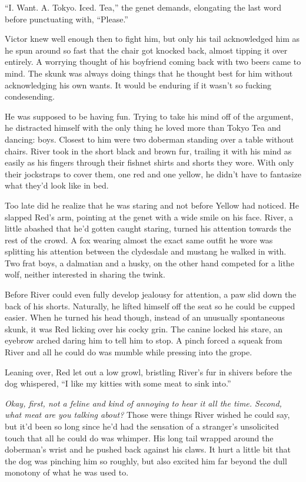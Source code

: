 ``I. Want. A. Tokyo. Iced. Tea,'' the genet demands, elongating the last
word before punctuating with, ``Please.''

Victor knew well enough then to fight him, but only his tail
acknowledged him as he spun around so fast that the chair got knocked
back, almost tipping it over entirely. A worrying thought of his
boyfriend coming back with two beers came to mind. The skunk was always
doing things that he thought best for him without acknowledging his own
wants. It would be enduring if it wasn't so fucking condesending.

He was supposed to be having fun. Trying to take his mind off of the
argument, he distracted himself with the only thing he loved more than
Tokyo Tea and dancing: boys. Closest to him were two doberman standing
over a table without chairs. River took in the short black and brown
fur, trailing it with his mind as easily as his fingers through their
fishnet shirts and shorts they wore. With only their jockstraps to cover
them, one red and one yellow, he didn't have to fantasize what they'd
look like in bed.

Too late did he realize that he was staring and not before Yellow had
noticed. He slapped Red's arm, pointing at the genet with a wide smile
on his face. River, a little abashed that he'd gotten caught staring,
turned his attention towards the rest of the crowd. A fox wearing almost
the exact same outfit he wore was splitting his attention between the
clydesdale and mustang he walked in with. Two frat boys, a dalmatian and
a husky, on the other hand competed for a lithe wolf, neither interested
in sharing the twink.

Before River could even fully develop jealousy for attention, a paw slid
down the back of his shorts. Naturally, he lifted himself off the seat
so he could be cupped easier. When he turned his head though, instead of
an unusually spontaneous skunk, it was Red licking over his cocky grin.
The canine locked his stare, an eyebrow arched daring him to tell him to
stop. A pinch forced a squeak from River and all he could do was mumble
while pressing into the grope.

Leaning over, Red let out a low growl, bristling River's fur in shivers
before the dog whispered, ``I like my kitties with some meat to sink
into.''

\emph{Okay, first, not a feline and kind of annoying to hear it all the
time. Second, what meat are you talking about?} Those were things River
wished he could say, but it'd been so long since he'd had the sensation
of a stranger's unsolicited touch that all he could do was whimper. His
long tail wrapped around the doberman's wrist and he pushed back against
his claws. It hurt a little bit that the dog was pinching him so
roughly, but also excited him far beyond the dull monotony of what he
was used to.

